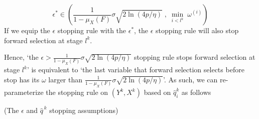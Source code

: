 \documentclass[11pt,review,authoryear]{elsarticle}
\begin{document}
\begin{appendices}
\begin{itemize}
  \begin{equation}
    \epsilon^* \in \left( \frac{1}{1 - \mu_X \left( F \right)} \sigma \sqrt{ 2 \ln \left(4p / \eta \right)} \; , \; \min_{i < l^k} \; \omega^{\left( i \right)} \right) \label{eqn:omega_epsilon}
  \end{equation}
  If we equip the $\epsilon$ stopping rule with the $\epsilon^*$, the $\epsilon$ stopping rule will also stop forward selection at stage $l^k$.
\end{itemize}
\medskip

\noindent
Hence, `the $\epsilon > \frac{1}{1 - \mu_X \left( F \right)} \sigma \sqrt{ 2 \ln \left(4p / \eta \right)}$ stopping rule stops forward selection at stage $l^k$' is equivalent to `the last variable that forward selection selects before stop has its $\omega$ larger than $\frac{1}{1-\mu_{X}\left(F\right)}\sigma\sqrt{2\ln\left(4p/\eta\right)}$'. As such, we can re-parameterize the stopping rule on $\left(Y^{k},X^{k}\right)$ based on $\widehat{q}_{i}^{k}$ as follows
%
\begin{definition}
  (The $\epsilon$ and $\widehat{q}^{\,k}$ stopping assumptions) \label{def:stopping assumption}
\end{definition}


\end{appendices}
\end{document}
